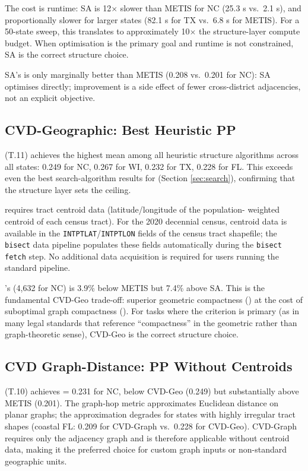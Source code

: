 The cost is runtime: SA is 12$\times$ slower than METIS for NC (25.3 s
vs.\ 2.1 s), and proportionally slower for larger states (82.1 s for TX
vs.\ 6.8 s for METIS).
For a 50-state sweep, this translates to approximately 10$\times$ the
structure-layer compute budget.
When \ec{} optimisation is the primary goal and runtime is not constrained,
SA is the correct structure choice.

SA's \pp{} is only marginally better than METIS (0.208 vs.\ 0.201 for NC):
SA optimises \ec{} directly; \pp{} improvement is a side effect of fewer
cross-district adjacencies, not an explicit objective.

\subsection{CVD-Geographic: Best Heuristic PP}

\cvdgeo{} (T.11) achieves the highest mean \pp{} among all heuristic
structure algorithms across all states: 0.249 for NC, 0.267 for WI, 0.232
for TX, 0.228 for FL.
This exceeds even the best search-algorithm results for \pp{} (Section
\ref{sec:search}), confirming that the structure layer sets the \pp{} ceiling.

\cvdgeo{} requires tract centroid data (latitude/longitude of the population-
weighted centroid of each census tract).
For the 2020 decennial census, centroid data is available in the
\texttt{INTPTLAT}/\texttt{INTPTLON} fields of the census tract shapefile;
the \texttt{bisect} data pipeline populates these fields automatically during
the \texttt{bisect fetch} step.
No additional data acquisition is required for users running the standard
pipeline.

\cvdgeo{}'s \ec{} (4{,}632 for NC) is 3.9\% below METIS but 7.4\% above SA.
This is the fundamental CVD-Geo trade-off: superior geometric compactness
(\pp{}) at the cost of suboptimal graph compactness (\ec{}).
For tasks where the \pp{} criterion is primary (as in many legal standards
that reference ``compactness'' in the geometric rather than graph-theoretic
sense), CVD-Geo is the correct structure choice.

\subsection{CVD Graph-Distance: PP Without Centroids}

\cvdg{} (T.10) achieves \pp{} = 0.231 for NC, below CVD-Geo (0.249) but
substantially above METIS (0.201).
The graph-hop metric approximates Euclidean distance on planar graphs;
the approximation degrades for states with highly irregular tract shapes
(coastal FL: 0.209 for CVD-Graph vs.\ 0.228 for CVD-Geo).
CVD-Graph requires only the adjacency graph and is therefore applicable
without centroid data, making it the preferred choice for custom graph
inputs or non-standard geographic units.

